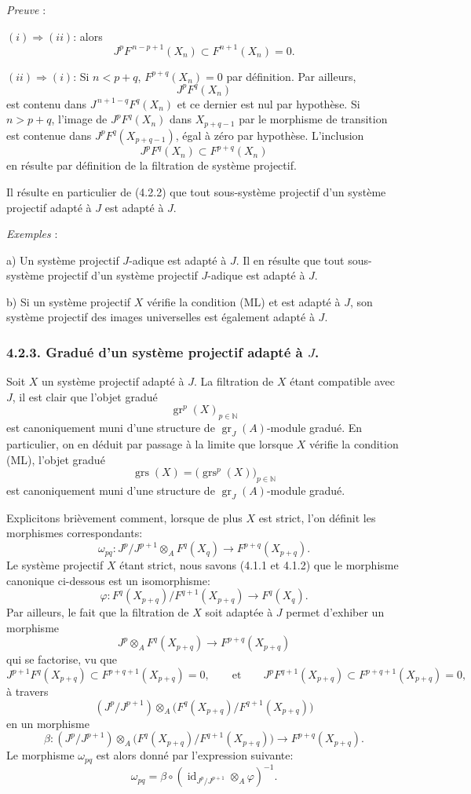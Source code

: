 \documentclass[11pt]{article}
\providecommand{\gr}{\operatorname{gr}}
\providecommand{\id}{\operatorname{id}}
\providecommand{\id}{\operatorname{id}}
\providecommand{\gr}{\operatorname{gr}}
\providecommand{\gr}{\operatorname{gr}}
\providecommand{\grs}{\operatorname{grs}}
\providecommand{\id}{\operatorname{id}}
\providecommand{\id}{\operatorname{id}}
\providecommand{\id}{\operatorname{id}}
\providecommand{\id}{\operatorname{id}}
\begin{document}
\emph{Preuve} :

\((i)\Rightarrow(ii)\): alors
\[
J^pF^{\,n-p+1}(X_n)\subset F^{n+1}(X_n)=0.
\]

\((ii)\Rightarrow(i)\): Si \(n<p+q\), \(F^{p+q}(X_n)=0\) par définition. Par
ailleurs,
\[
J^pF^q(X_n)
\]
est contenu dans \(J^{\,n+1-q}F^q(X_n)\) et ce dernier est nul par hypothèse. Si \(n>p+q\), l'image de \(J^pF^q(X_n)\) dans \(X_{p+q-1}\) par le morphisme de transition est contenue dans \(J^pF^q(X_{p+q-1})\), égal à zéro par hypothèse. L'inclusion
\[
J^pF^q(X_n)\subset F^{p+q}(X_n)
\]
en résulte par définition de la filtration de système projectif.

Il résulte en particulier de (4.2.2) que tout sous-système projectif d'un système projectif adapté à \(J\) est adapté à \(J\).

\emph{Exemples} :

a) Un système projectif \(J\)-adique est adapté à \(J\). Il en résulte que tout sous-système projectif d'un système projectif \(J\)-adique est adapté à \(J\).

b) Si un système projectif \(X\) vérifie la condition (ML) et est adapté à \(J\), son système projectif des images universelles est également adapté à \(J\).

\subsubsection*{4.2.3. Gradué d'un système projectif adapté à \(J\).}
Soit \(X\) un système projectif adapté à \(J\). La filtration de \(X\) étant compatible avec \(J\), il est clair que l'objet gradué
\[
\gr^p(X)_{p\in\mathbb N}
\]
est canoniquement muni d'une structure de \(\gr_J(A)\)-module gradué. En particulier, on en déduit par passage à la limite que lorsque \(X\) vérifie la condition (ML), l'objet gradué
\[
\grs(X)=\bigl(\grs^p(X)\bigr)_{p\in\mathbb N}
\]
est canoniquement muni d'une structure de \(\gr_J(A)\)-module gradué.

Explicitons brièvement comment, lorsque de plus \(X\) est strict, l'on définit les morphismes correspondants:
\[
\omega_{pq}: J^p/J^{p+1}\otimes_A F^q(X_q)\longrightarrow F^{p+q}(X_{p+q}).
\]
Le
système projectif \(X\) étant strict, nous savons (4.1.1 et 4.1.2) que le morphisme canonique ci-dessous est un isomorphisme:
\[
\varphi:F^q(X_{p+q})/F^{q+1}(X_{p+q})\longrightarrow F^q(X_q).
\]
Par ailleurs, le fait que la filtration de \(X\) soit adaptée à \(J\) permet d'exhiber un morphisme
\[
J^p\otimes_A F^q(X_{p+q})\longrightarrow F^{p+q}(X_{p+q})
\]
qui se factorise, vu que
\[
J^{p+1}F^q(X_{p+q})\subset F^{p+q+1}(X_{p+q})=0,\qquad\text{et}\qquad
J^pF^{q+1}(X_{p+q})\subset F^{p+q+1}(X_{p+q})=0,
\]
à travers
\[
(J^p/J^{p+1})\otimes_A
\bigl(F^q(X_{p+q})/F^{q+1}(X_{p+q})\bigr)
\]
en un morphisme
\[
\beta:(J^p/J^{p+1})\otimes_A
\bigl(F^q(X_{p+q})/F^{q+1}(X_{p+q})\bigr)
\longrightarrow F^{p+q}(X_{p+q}).
\]
Le morphisme \(\omega_{pq}\) est alors donné par l'expression suivante:
\[
\omega_{pq}=\beta\circ(\id_{J^p/J^{p+1}}\otimes_A\varphi)^{-1}.
\]
\end{document}
